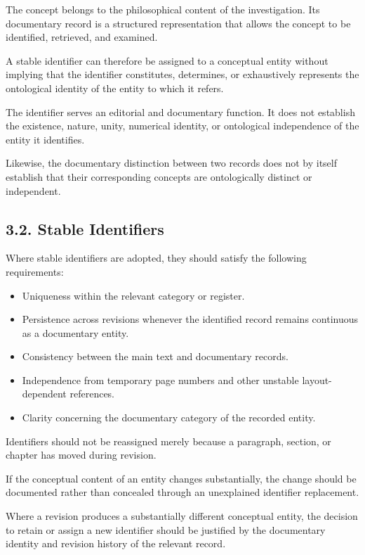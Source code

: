 The concept belongs to the philosophical content
of the investigation. Its documentary record is
a structured representation that allows the concept
to be identified, retrieved, and examined.

A stable identifier can therefore be assigned
to a conceptual entity without implying that
the identifier constitutes, determines, or
exhaustively represents the ontological identity
of the entity to which it refers.

The identifier serves an editorial and documentary
function. It does not establish the existence,
nature, unity, numerical identity, or ontological
independence of the entity it identifies.

Likewise, the documentary distinction between
two records does not by itself establish that
their corresponding concepts are ontologically
distinct or independent.

\subsection*{3.2. Stable Identifiers}

Where stable identifiers are adopted, they should
satisfy the following requirements:

\begin{itemize}
    \item Uniqueness within the relevant category
    or register.
    \item Persistence across revisions whenever
    the identified record remains continuous
    as a documentary entity.
    \item Consistency between the main text and
    documentary records.
    \item Independence from temporary page numbers
    and other unstable layout-dependent references.
    \item Clarity concerning the documentary category
    of the recorded entity.
\end{itemize}

Identifiers should not be reassigned merely because
a paragraph, section, or chapter has moved during
revision.

If the conceptual content of an entity changes
substantially, the change should be documented
rather than concealed through an unexplained
identifier replacement.

Where a revision produces a substantially different
conceptual entity, the decision to retain or assign
a new identifier should be justified by the
documentary identity and revision history of
the relevant record.

